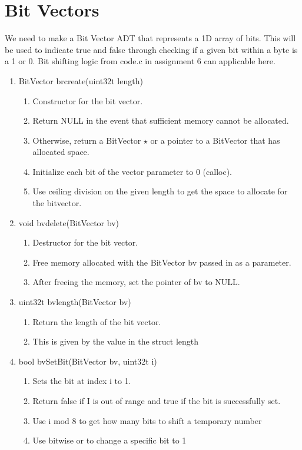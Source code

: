 \documentclass[11pt]{article}
\begin{document}
\section{Bit Vectors}\label{ss:bitvector}
We need to make a Bit Vector ADT that represents a 1D array of bits. This will be used to indicate true and false through checking if a given bit within a byte is a 1 or 0. Bit shifting logic from code.c in assignment 6 can applicable here.
\begin{enumerate}
\item BitVector brcreate(uint32t length)
	\begin{enumerate}
	\item Constructor for the bit vector.
	\item Return NULL in the event that sufficient memory cannot be allocated.
	\item Otherwise, return a BitVector $\star$ or a pointer to a BitVector that has allocated space.
	\item Initialize each bit of the vector parameter to 0 (calloc).
	\item Use ceiling division on the given length to get the space to allocate for the bitvector.
	\end{enumerate}
\item void bvdelete(BitVector bv)
	\begin{enumerate}
	\item Destructor for the bit vector.
	\item Free memory allocated with the BitVector bv passed in as a parameter.
	\item After freeing the memory, set the pointer of bv to NULL.
	\end{enumerate}
\item uint32t bvlength(BitVector bv)
	\begin{enumerate}
	\item Return the length of the bit vector.
	\item This is given by the value in the struct length
	\end{enumerate}
\item bool bvSetBit(BitVector bv, uint32t i)
	\begin{enumerate}
	\item Sets the bit at index i to 1.
	\item Return false if I is out of range and true if the bit is successfully set.
	\item Use i mod 8 to get how many bits to shift a temporary number
	\item Use bitwise or to change a specific bit to 1

\end{enumerate}
\end{enumerate}
\end{document}
